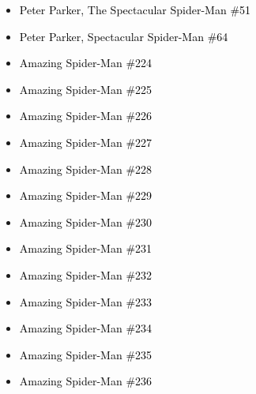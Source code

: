 \documentclass[12pt]{article}
\newcommand{\checkbox}{\raisebox{0.0ex}{\fbox{\rule{0ex}{1.5ex} \rule{1.5ex}{0ex}}}}
\begin{document}
\begin{center}
\begin{tcolorbox}[colback=white!95!gray, colframe=black, width=0.9\textwidth, arc=4mm, auto outer arc, boxrule=0.8pt]
\begin{itemize}[left=0pt,label={\checkbox}]
    \item \textcolor{black}{Peter Parker, The Spectacular Spider-Man \#51}
    \item \textcolor{black}{Peter Parker, Spectacular Spider-Man \#64}
    \item \textcolor{black}{Amazing Spider-Man \#224}
    \item \textcolor{black}{Amazing Spider-Man \#225}
    \item \textcolor{black}{Amazing Spider-Man \#226}
    \item \textcolor{black}{Amazing Spider-Man \#227}
    \item \textcolor{black}{Amazing Spider-Man \#228}
    \item \textcolor{black}{Amazing Spider-Man \#229}
    \item \textcolor{black}{Amazing Spider-Man \#230}
    \item \textcolor{black}{Amazing Spider-Man \#231}
    \item \textcolor{black}{Amazing Spider-Man \#232}
    \item \textcolor{black}{Amazing Spider-Man \#233}
    \item \textcolor{black}{Amazing Spider-Man \#234}
    \item \textcolor{black}{Amazing Spider-Man \#235}
    \item \textcolor{black}{Amazing Spider-Man \#236}
\end{itemize}
\end{tcolorbox}
\end{center}
\end{document}
